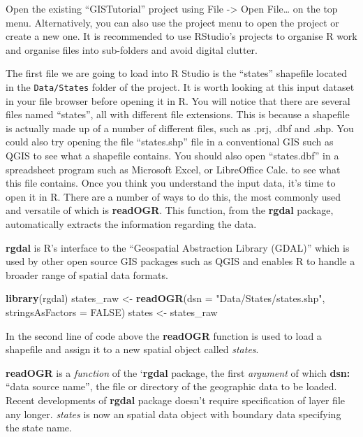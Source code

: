 \documentclass[]{article}
\newenvironment{Shaded}{}{}
\newcommand{\DataTypeTok}[1]{\textcolor[rgb]{0.56,0.13,0.00}{#1}}
\newcommand{\KeywordTok}[1]{\textcolor[rgb]{0.00,0.44,0.13}{\textbf{#1}}}
\newcommand{\NormalTok}[1]{#1}
\newcommand{\OtherTok}[1]{\textcolor[rgb]{0.00,0.44,0.13}{#1}}
\newcommand{\StringTok}[1]{\textcolor[rgb]{0.25,0.44,0.63}{#1}}
\begin{document}
Open the existing ``GISTutorial'' project using File -\textgreater{}
Open File\ldots{} on the top menu. Alternatively, you can also use the
project menu to open the project or create a new one. It is recommended
to use RStudio's projects to organise R work and organise files into
sub-folders and avoid digital clutter.

The ﬁrst ﬁle we are going to load into R Studio is the ``states''
shapeﬁle located in the \texttt{Data/States} folder of the project. It
is worth looking at this input dataset in your ﬁle browser before
opening it in R. You will notice that there are several ﬁles named
``states'', all with different ﬁle extensions. This is because a
shapeﬁle is actually made up of a number of different ﬁles, such as
.prj, .dbf and .shp. You could also try opening the ﬁle ``states.shp''
ﬁle in a conventional GIS such as QGIS to see what a shapeﬁle contains.
You should also open ``states.dbf'' in a spreadsheet program such as
Microsoft Excel, or LibreOffice Calc. to see what this ﬁle contains.
Once you think you understand the input data, it's time to open it in R.
There are a number of ways to do this, the most commonly used and
versatile of which is \textbf{readOGR}. This function, from the
\textbf{rgdal} package, automatically extracts the information regarding
the data.

\textbf{rgdal} is R's interface to the ``Geospatial Abstraction Library
(GDAL)'' which is used by other open source GIS packages such as QGIS
and enables R to handle a broader range of spatial data formats.

\begin{Shaded}
\begin{Highlighting}[]
\KeywordTok{library}\NormalTok{(rgdal)}
\NormalTok{states_raw <-}\StringTok{ }\KeywordTok{readOGR}\NormalTok{(}\DataTypeTok{dsn =} \StringTok{"Data/States/states.shp"}\NormalTok{, }\DataTypeTok{stringsAsFactors =} \OtherTok{FALSE}\NormalTok{)}
\NormalTok{states <-}\StringTok{ }\NormalTok{states_raw}
\end{Highlighting}
\end{Shaded}

In the second line of code above the \textbf{readOGR} function is used
to load a shapefile and assign it to a new spatial object called
\emph{states}.

\textbf{readOGR} is a \emph{function} of the `\textbf{rgdal} package,
the first \emph{argument} of which \textbf{dsn:} ``data source name'',
the file or directory of the geographic data to be loaded. Recent
developments of \textbf{rgdal} package doesn't require specification of
layer file any longer. \emph{states} is now an spatial data object with
boundary data specifying the state name.
\end{document}
